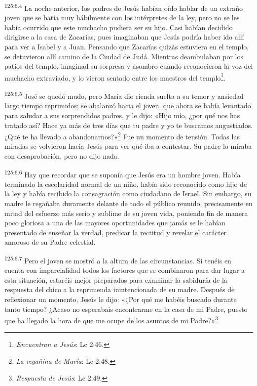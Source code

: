 \par 
\textsuperscript{125:6.4} La noche anterior, los padres de Jesús habían oído hablar de un extraño joven que se batía muy hábilmente con los intérpretes de la ley, pero no se les había ocurrido que este muchacho pudiera ser su hijo. Casi habían decidido dirigirse a la casa de Zacarías, pues imaginaban que Jesús podría haber ido allí para ver a Isabel y a Juan. Pensando que Zacarías quizás estuviera en el templo, se detuvieron allí camino de la Ciudad de Judá. Mientras deambulaban por los patios del templo, imaginad su sorpresa y asombro cuando reconocieron la voz del muchacho extraviado, y lo vieron sentado entre los maestros del templo\footnote{\textit{Encuentran a Jesús}: Lc 2:46.}.

\par 
\textsuperscript{125:6.5} José se quedó mudo, pero María dio rienda suelta a su temor y ansiedad largo tiempo reprimidos; se abalanzó hacia el joven, que ahora se había levantado para saludar a sus sorprendidos padres, y le dijo: «Hijo mío, ¿por qué nos has tratado así? Hace ya más de tres días que tu padre y yo te buscamos angustiados. ¿Qué te ha llevado a abandonarnos?»\footnote{\textit{La regañina de María}: Lc 2:48.} Fue un momento de tensión. Todas las miradas se volvieron hacia Jesús para ver qué iba a contestar. Su padre lo miraba con desaprobación, pero no dijo nada.

\par 
\textsuperscript{125:6.6} Hay que recordar que se suponía que Jesús era un hombre joven. Había terminado la escolaridad normal de un niño, había sido reconocido como hijo de la ley y había recibido la consagración como ciudadano de Israel. Sin embargo, su madre le regañaba duramente delante de todo el público reunido, precisamente en mitad del esfuerzo más serio y sublime de su joven vida, poniendo fin de manera poco gloriosa a una de las mayores oportunidades que jamás se le habían presentado de enseñar la verdad, predicar la rectitud y revelar el carácter amoroso de su Padre celestial.

\par 
\textsuperscript{125:6.7} Pero el joven se mostró a la altura de las circunstancias. Si tenéis en cuenta con imparcialidad todos los factores que se combinaron para dar lugar a esta situación, estaréis mejor preparados para examinar la sabiduría de la respuesta del chico a la reprimenda inintencionada de su madre. Después de reflexionar un momento, Jesús le dijo: «¿Por qué me habéis buscado durante tanto tiempo? ¿Acaso no esperabais encontrarme en la casa de mi Padre, puesto que ha llegado la hora de que me ocupe de los asuntos de mi Padre?»\footnote{\textit{Respuesta de Jesús}: Lc 2:49.}

